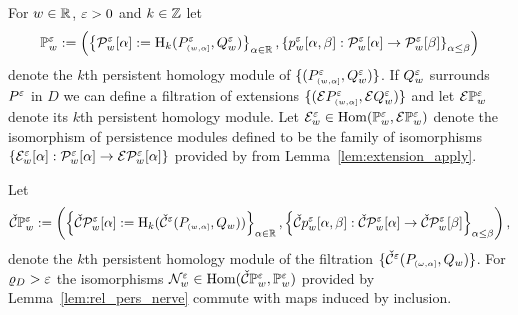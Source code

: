
For $w\in\R$, $\e > 0$ and $k\in\Z$ let
\[\PP{w}{\e} := \left(\left\{\P{w}{\e}{\alpha} := \hom_k(P\subi{w,\alpha}^\e,Q_w^\e)\right\}_{\alpha\in\R}, \left\{p_w^\e[\alpha,\beta] : \P{w}{\e}{\alpha}\to\P{w}{\e}{\beta}\right\}_{\alpha\leq\beta}\right)\]
denote the $k$th persistent homology module of $\{(P\subi{w,\alpha}^\e,Q_w^\e)\}$.
If $Q_w^\e$ surrounds $P^\e$ in $D$ we can define a filtration of extensions $\{(\ext{P\subi{w,\alpha}^\e},\ext{Q_w^\e})\}$ and let $\ext{\PP{w}{\e}}$ denote its $k$th persistent homology module.
Let
$\E_w^\e \in \Hom(\PP{w}{\e},\ext{\PP{w}{\e}})$
denote the isomorphism of persistence modules defined to be the family of isomorphisms $\{\E_w^\e[\alpha] : \P{w}{\e}{\alpha}\to \ext{\P{w}{\e}{\alpha}}\}$ provided by from Lemma~\ref{lem:extension_apply}.

Let
\[\CPP{w}{\e} := \left(\left\{\CP{w}{\e}{\alpha} := \hom_k(\cech^\e(P\subi{w,\alpha}, Q_w))\right\}_{\alpha\in\R}, \left\{\cech p_w^\e[\alpha,\beta] : \CP{w}{\e}{\alpha}\to\CP{w}{\e}{\beta}\right\}_{\alpha\leq\beta}\right),\]
denote the $k$th persistent homology module of the \Cech filtration $\{\cech^\e(P\subi{\omega,\alpha}, Q_w)\}$.
For $\varrho_D > \e$ the isomorphisms $\N_w^\e\in\Hom(\CPP{w}{\e}, \PP{w}{\e})$ provided by Lemma~\ref{lem:rel_pers_nerve} commute with maps induced by inclusion.

%

